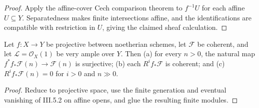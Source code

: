 \begin{proof}

Apply the affine-cover Cech comparison theorem to $f^{-1}U$ for each affine $U\subseteq Y$.
Separatedness makes finite intersections affine, and the identifications are compatible with
restriction in $U$, giving the claimed sheaf calculation.

\end{proof}
\begin{theorem}\label{ha-ch3-thm-direct-image-coherent}
Let $f:X\to Y$ be projective between noetherian schemes, let $\mathcal F$ be
coherent, and let $\mathcal L=\mathcal O_X(1)$ be very ample over $Y$.  Then
(a) for every $n>0$, the natural map
$f^*f_*\mathcal F(n)\to\mathcal F(n)$ is surjective; (b) each
$R^if_*\mathcal F$ is coherent; and (c) $R^if_*\mathcal F(n)=0$ for
$i>0$ and $n\gg0$.

\end{theorem}
\begin{proof}
Reduce to projective space, use the finite generation and eventual
vanishing of III.5.2 on affine opens, and glue the resulting finite modules.
\end{proof}

